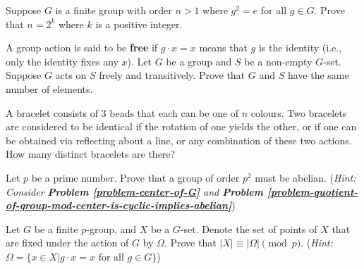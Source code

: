 \begin{problem}
    Suppose $G$ is a finite group with order $n > 1$ where $g^2 = e$ for all $g \in G$. Prove that $n = 2^k$ where $k$ is a positive integer.
\end{problem}

\begin{problem}
    A group action is said to be \textbf{free} if $g\cdot x = x$ means that $g$ is the identity (i.e., only the identity fixes any $x$).\newline
    Let $G$ be a group and $S$ be a non-empty $G$-set. Suppose $G$ acts on $S$ freely and transitively. Prove that $G$ and $S$ have the same number of elements.
\end{problem}

\begin{problem}
    A bracelet consists of 3 beads that each can be one of $n$ colours. Two bracelets are considered to be identical if the rotation of one yields the other, or if one can be obtained via reflecting about a line, or any combination of these two actions. How many distinct bracelets are there?
\end{problem}

\begin{problem}\label{problem-group-of-order-prime-squared-is-abelian}
    Let $p$ be a prime number. Prove that a group of order $p^2$ must be abelian.\newline
    (\textit{Hint: Consider \textbf{Problem \ref{problem-center-of-G}} and \textbf{Problem \ref{problem-quotient-of-group-mod-center-is-cyclic-implies-abelian}}})
\end{problem}

\newpage

\begin{problem}
    Let $G$ be a finite $p$-group, and $X$ be a $G$-set. Denote the set of points of $X$ that are fixed under the action of $G$ by $\Omega$. Prove that $|X| \equiv |\Omega| \pmod p$.\newline
    (\textit{Hint: $\Omega = \{x \in X \vert g\cdot x = x \textrm{ for all } g \in G\}$})
\end{problem}


